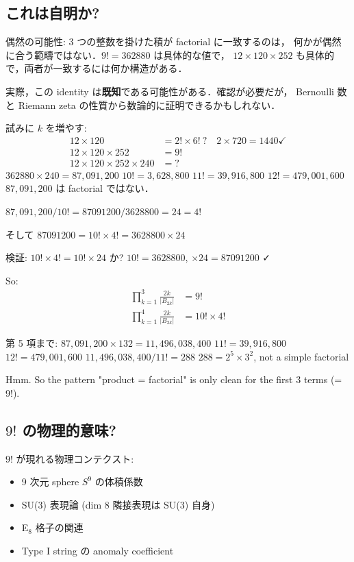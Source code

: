 \documentclass[11pt,a4paper]{article}
\begin{document}
\subsection{これは自明か?}

偶然の可能性: 3 つの整数を掛けた積が factorial に一致するのは，
何かが偶然に合う範疇ではない．$9! = 362880$ は具体的な値で，
$12 \times 120 \times 252$ も具体的で，両者が一致するには何か構造がある．

実際，この identity は\textbf{既知}である可能性がある．確認が必要だが，
Bernoulli 数と Riemann zeta の性質から数論的に証明できるかもしれない．

試みに $k$ を増やす:
\begin{align}
12 \times 120 &= 2! \times 6! \ ? \quad 2 \times 720 = 1440 \checkmark\\
12 \times 120 \times 252 &= 9!\\
12 \times 120 \times 252 \times 240 &= ?
\end{align}
$362880 \times 240 = 87,091,200$
$10! = 3,628,800$
$11! = 39,916,800$
$12! = 479,001,600$
$87,091,200$ は factorial ではない．

$87,091,200 / 10! = 87091200 / 3628800 = 24 = 4!$

そして $87091200 = 10! \times 4! = 3628800 \times 24$

検証: $10! \times 4! = 10! \times 24$ か? $10! = 3628800$, $\times 24 = 87091200$ ✓

So:
\begin{align}
\prod_{k=1}^{3} \frac{2k}{|B_{2k}|} &= 9! \\
\prod_{k=1}^{4} \frac{2k}{|B_{2k}|} &= 10! \times 4!
\end{align}

第 5 項まで:
$87,091,200 \times 132 = 11,496,038,400$
$11! = 39,916,800$
$12! = 479,001,600$
$11,496,038,400 / 11! = 288$
$288 = 2^5 \times 3^2$, not a simple factorial

Hmm. So the pattern "product = factorial" is only clean for the first 3 terms (= 9!).

\subsection{$9!$ の物理的意味?}

$9!$ が現れる物理コンテクスト:
\begin{itemize}
\item 9 次元 sphere $S^9$ の体積係数
\item SU(3) 表現論 (dim 8 隣接表現は SU(3) 自身)
\item E$_8$ 格子の関連
\item Type I string の anomaly coefficient
\end{itemize}
\end{document}
